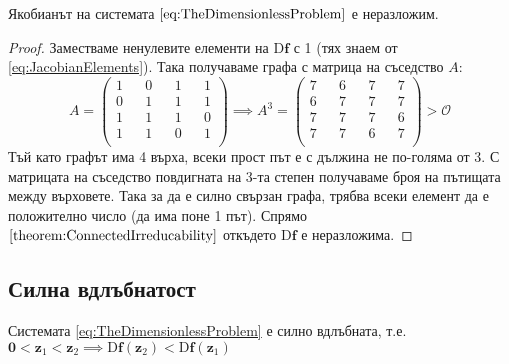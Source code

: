 \begin{proposition}
  \label{prop:Irreducable}
  Якобианът на системата $\eqref{eq:TheDimensionlessProblem}$ е неразложим.
\end{proposition}
\begin{proof}
  Заместваме ненулевите елементи на $\mathrm{D} \mathbf{f}$ с 1 (тях знаем от \eqref{eq:JacobianElements}). Така получаваме графа с матрица на съседство $A$:
  \begin{equation}
    A =
    \begin{pmatrix}
      1 && 0 && 1 && 1 \\
      0 && 1 && 1 && 1 \\
      1 && 1 && 1 && 0 \\
      1 && 1 && 0 && 1 \\
    \end{pmatrix}
    \implies
    A^3 =
    \begin{pmatrix}
      7 && 6 && 7 && 7 \\
      6 && 7 && 7 && 7 \\
      7 && 7 && 7 && 6 \\
      7 && 7 && 6 && 7 \\
    \end{pmatrix}
    >
    \mathscr{O}
  \end{equation}
  Тъй като графът има 4 върха, всеки прост път е с дължина не по-голяма от 3.
  С матрицата на съседство повдигната на 3-та степен получаваме броя на пътищата между върховете.
  Така за да е силно свързан графа, трябва всеки елемент да е положително число (да има поне 1 път).
  Спрямо $\eqref{theorem:ConnectedIrreducability}$ откъдето $\mathrm{D}\mathbf{f}$ е неразложима.
  \end{proof}

\subsection{Силна вдлъбнатост}
\begin{proposition}
  \label{prop:StronglyConcave}
  Системата \eqref{eq:TheDimensionlessProblem} е силно вдлъбната, т.е. $\mathbf{0} < \mathbf{z}_1 < \mathbf{z}_2 \implies \mathrm{D}\mathbf{f}(\mathbf{z}_2) < \mathrm{D}\mathbf{f}(\mathbf{z}_1)$
\end{proposition}

